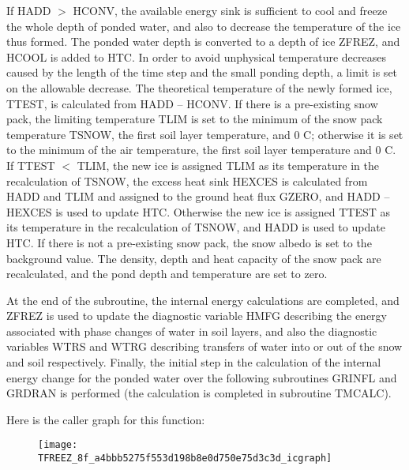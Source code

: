 If H\+A\+D\+D $>$ H\+C\+O\+N\+V, the available energy sink is sufficient to cool and freeze the whole depth of ponded water, and also to decrease the temperature of the ice thus formed. The ponded water depth is converted to a depth of ice Z\+F\+R\+E\+Z, and H\+C\+O\+O\+L is added to H\+T\+C. In order to avoid unphysical temperature decreases caused by the length of the time step and the small ponding depth, a limit is set on the allowable decrease. The theoretical temperature of the newly formed ice, T\+T\+E\+S\+T, is calculated from H\+A\+D\+D – H\+C\+O\+N\+V. If there is a pre-\/existing snow pack, the limiting temperature T\+L\+I\+M is set to the minimum of the snow pack temperature T\+S\+N\+O\+W, the first soil layer temperature, and 0 C; otherwise it is set to the minimum of the air temperature, the first soil layer temperature and 0 C. If T\+T\+E\+S\+T $<$ T\+L\+I\+M, the new ice is assigned T\+L\+I\+M as its temperature in the recalculation of T\+S\+N\+O\+W, the excess heat sink H\+E\+X\+C\+E\+S is calculated from H\+A\+D\+D and T\+L\+I\+M and assigned to the ground heat flux G\+Z\+E\+R\+O, and H\+A\+D\+D – H\+E\+X\+C\+E\+S is used to update H\+T\+C. Otherwise the new ice is assigned T\+T\+E\+S\+T as its temperature in the recalculation of T\+S\+N\+O\+W, and H\+A\+D\+D is used to update H\+T\+C. If there is not a pre-\/existing snow pack, the snow albedo is set to the background value. The density, depth and heat capacity of the snow pack are recalculated, and the pond depth and temperature are set to zero.

At the end of the subroutine, the internal energy calculations are completed, and Z\+F\+R\+E\+Z is used to update the diagnostic variable H\+M\+F\+G describing the energy associated with phase changes of water in soil layers, and also the diagnostic variables W\+T\+R\+S and W\+T\+R\+G describing transfers of water into or out of the snow and soil respectively. Finally, the initial step in the calculation of the internal energy change for the ponded water over the following subroutines G\+R\+I\+N\+F\+L and G\+R\+D\+R\+A\+N is performed (the calculation is completed in subroutine T\+M\+C\+A\+L\+C).

Here is the caller graph for this function\+:\nopagebreak
\begin{figure}[H]
\begin{center}
\leavevmode
\texttt{[image: TFREEZ\_8f\_a4bbb5275f553d198b8e0d750e75d3c3d\_icgraph]}
\end{center}
\end{figure}


